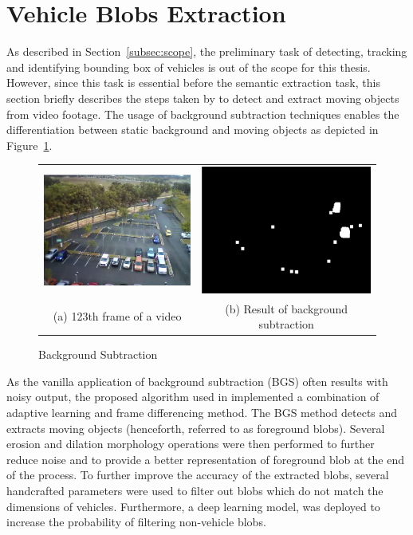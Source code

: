 \section{Vehicle Blobs Extraction}
\label{subsection:fundamental}

As described in Section~\ref{subsec:scope}, the preliminary task of detecting, tracking and identifying bounding box of vehicles is out of the scope for this thesis. However, since this task is essential before the semantic extraction task, this section briefly describes the steps taken by  to detect and extract moving objects from video footage. The usage of background subtraction techniques enables the differentiation between static background and moving objects as depicted in Figure~\ref{fig:bgs}.

\begin{figure}[htb!]
  \centering
  \begin{tabular}{cc}
  \includegraphics[width=0.4\linewidth]{image/general/bgs1.png} &
  \includegraphics[width=0.4\linewidth]{image/general/bgs2.png}  \\
  (a) 123th frame of a video & (b) Result of background subtraction \\
  \end{tabular}
  \caption{Background Subtraction}
  \label{fig:bgs}
\end{figure}

As the vanilla application of background subtraction (BGS) often results with noisy output, the proposed algorithm used in \cite{lim2017} implemented a combination of adaptive learning and frame differencing method. The BGS method detects and extracts moving objects (henceforth, referred to as foreground blobs).
Several erosion and dilation morphology operations were then performed to further reduce noise and to provide a better representation of foreground blob at the end of the process.
To further improve the accuracy of the extracted blobs, several handcrafted parameters were used to filter out blobs which do not match the dimensions of vehicles.
Furthermore, a deep learning model, was deployed to increase the probability of filtering non-vehicle blobs.


